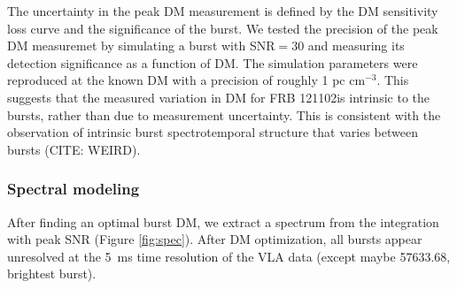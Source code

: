 \documentclass[twocolumn]{aastex61}
\newcommand{\frb}{FRB 121102}
\begin{document}
The uncertainty in the peak DM measurement is defined by the DM sensitivity loss curve and the significance of the burst. We tested the precision of the peak DM measuremet by simulating a burst with SNR$=30$ and measuring its detection significance as a function of DM. The simulation parameters were reproduced at the known DM with a precision of roughly 1 pc cm$^{-3}$. This suggests that the measured variation in DM for \frb is intrinsic to the bursts, rather than due to measurement uncertainty. This is consistent with the observation of intrinsic burst spectrotemporal structure that varies between bursts (CITE: WEIRD).


\subsubsection{Spectral modeling}
After finding an optimal burst DM, we extract a spectrum from the integration with peak SNR (Figure \ref{fig:spec}). After DM optimization, all bursts appear unresolved at the 5~ms time resolution of the VLA data (except maybe 57633.68, brightest burst). 
\end{document}
